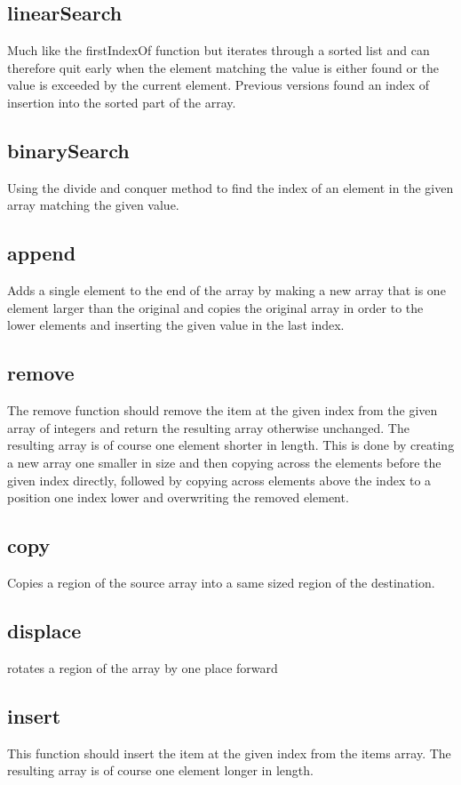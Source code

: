 \documentclass[10pt]{article} %
\begin{document}
\subsection{linearSearch}
Much like the firstIndexOf function but iterates through a sorted list and can therefore quit early when the element matching the value is either found or the value is exceeded by the current element. Previous versions found an index of insertion into the sorted part of the array.

\subsection{binarySearch}
Using the divide and conquer method to find the index of an element in the given array matching the given value.

\subsection{append}
Adds a single element to the end of the array by making a new array that is one element larger than the original and copies the original array in order to the lower elements and inserting the given value in the last index.

\subsection{remove}
The remove function should remove the item at the given index from the given array of integers and return the resulting array otherwise unchanged. The resulting array is of course one element shorter in length. This is done by creating a new array one smaller in size and then copying across the elements before the given index directly, followed by copying across elements above the index to a position one index lower and overwriting the removed element.

\subsection{copy}
Copies a region of the source array into a same sized region of the destination. 

\subsection{displace}
rotates a region of the array by one place forward

\subsection{insert}
This function should insert the item at the given index from the items array.  The resulting array is of course one element longer in length.
\end{document}
